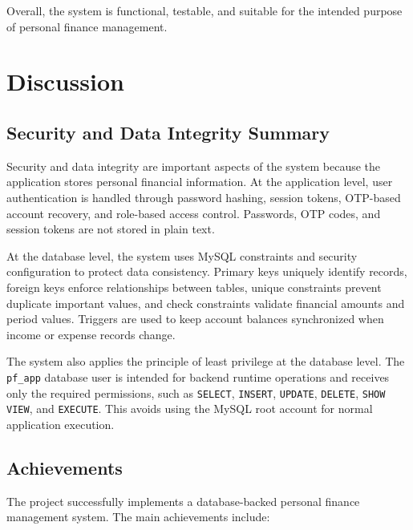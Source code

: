 ﻿\documentclass{article}
\begin{document}
Overall, the system is functional, testable, and suitable for the intended purpose of personal finance management.

\section{Discussion}
\label{sec:discussion}

\subsection{Security and Data Integrity Summary}

Security and data integrity are important aspects of the system because the application stores personal financial information. At the application level, user authentication is handled through password hashing, session tokens, OTP-based account recovery, and role-based access control. Passwords, OTP codes, and session tokens are not stored in plain text.

At the database level, the system uses MySQL constraints and security configuration to protect data consistency. Primary keys uniquely identify records, foreign keys enforce relationships between tables, unique constraints prevent duplicate important values, and check constraints validate financial amounts and period values. Triggers are used to keep account balances synchronized when income or expense records change.

The system also applies the principle of least privilege at the database level. The \texttt{pf\_app} database user is intended for backend runtime operations and receives only the required permissions, such as \texttt{SELECT}, \texttt{INSERT}, \texttt{UPDATE}, \texttt{DELETE}, \texttt{SHOW VIEW}, and \texttt{EXECUTE}. This avoids using the MySQL root account for normal application execution.

\subsection{Achievements}

The project successfully implements a database-backed personal finance management system. The main achievements include:
\end{document}
